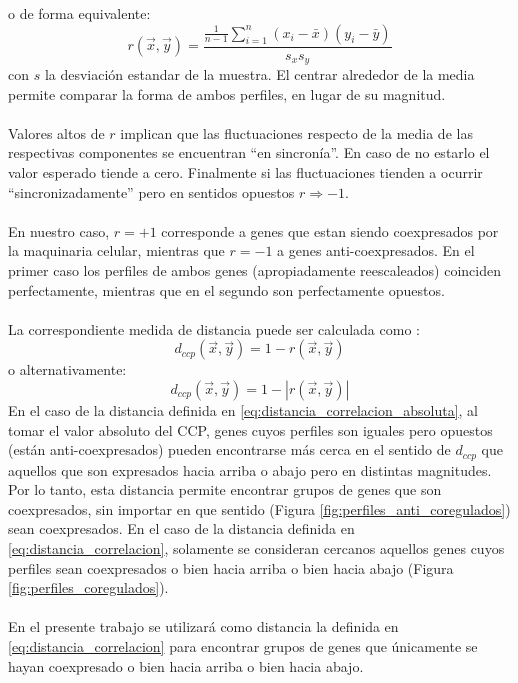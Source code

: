 o de forma equivalente:
\begin{equation}
	r(\vec{x}, \vec{y}) = \frac{\frac{1}{n-1}\sum\limits_{i=1}^n(x_i-\bar{x})(y_i-\bar{y})}{s_x s_y}
\end{equation}
con $s$ la desviación estandar de la muestra. El centrar alrededor de la media permite comparar la forma de ambos perfiles, en lugar de su magnitud.\\\\
Valores altos de $r$ implican que las fluctuaciones respecto de la media de las respectivas componentes se encuentran ``en sincronía''. En caso de no estarlo el valor esperado tiende a cero. Finalmente si las fluctuaciones tienden a ocurrir ``sincronizadamente'' pero en sentidos opuestos $r \Rightarrow -1$.\\\\
En nuestro caso, $r=+1$ corresponde a genes que estan siendo coexpresados por la maquinaria celular, mientras que $r=-1$ a genes anti-coexpresados. En el primer caso los perfiles de ambos genes
(apropiadamente reescaleados) coinciden perfectamente, mientras que en el segundo son perfectamente opuestos.\\\\
La correspondiente medida de distancia puede ser calculada como \cite{Dhaeseleer2005}:
\begin{equation}
	d_{ccp}(\vec{x}, \vec{y}) = 1-r(\vec{x}, \vec{y})
	\label{eq:distancia_correlacion}
\end{equation}
o alternativamente:
\begin{equation}
	d_{ccp}(\vec{x}, \vec{y}) = 1-|r(\vec{x}, \vec{y})|
	\label{eq:distancia_correlacion_absoluta}
\end{equation}
En el caso de la distancia definida en \ref{eq:distancia_correlacion_absoluta}, al tomar el valor absoluto del CCP, genes cuyos perfiles son iguales pero opuestos (están anti-coexpresados) pueden encontrarse más cerca en el sentido de $d_{ccp}$ que aquellos que son expresados hacia arriba o abajo pero en distintas magnitudes. Por lo tanto, esta distancia permite encontrar grupos de genes que son coexpresados, sin importar en que sentido (Figura \ref{fig:perfiles_anti_coregulados}) sean coexpresados.
En el caso de la distancia definida en \ref{eq:distancia_correlacion}, solamente se consideran cercanos aquellos genes cuyos perfiles sean coexpresados o bien hacia arriba o bien hacia abajo (Figura \ref{fig:perfiles_coregulados}).\cite{Hennig2013, Kheng2010, Babu2004, Gan2007}\\\\
En el presente trabajo se utilizará como distancia la definida en \ref{eq:distancia_correlacion} para encontrar grupos de genes que únicamente se hayan coexpresado o bien hacia arriba o bien hacia abajo.\cite{Eisen1998}
\clearpage

